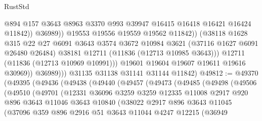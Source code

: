 \begin{lexlean}{RustStd}
\begin{coremodule}
                              @894
                              @157
                              @3643
                              @8963
                              @3370
                              @993
                              @39947
                              @16415
                              @16418
                              @16421
                              @16424
                              @11842))
                          @36989))
                      @19553
                      @19556
                      @19559
                      @19562
                      @11842))
                  (@38118
                    @1628
                    @315
                    @22
                    @27
                    @6091
                    @3643
                    @3574
                    @3672
                    @10984
                    @3621
                    (@37116 @1627 @6091 @26480 @26484)
                    @38181
                    @12711
                    (@11836 (@12713 @10985 @3643)))
                  @12711
                  (@11836 (@12713 @10969 @10991)))
                @19601
                @19604
                @19607
                @19611
                @19616
                @30969))
            @36989)))
      @31135
      @31138
      @31141
      @31144
      @11842)
@49812 := @49370
    (@49395
      (@49436
        (@49438
          (@49440
            (@49457
              (@49473
                (@49485
                  (@49498
                    (@49506
                      (@49510
                        (@49701
                          (@12331
                            @36096
                            @3259
                            @3259
                            @12335
                            @11008
                            @2917
                            @920
                            @896
                            @3643
                            @11046
                            @3643
                            @10840
                            (@38022
                              @2917
                              @896
                              @3643
                              @11045
                              (@37096
                                @359
                                @896
                                @2916
                                @51
                                @3643
                                @11044
                                @4247
                                @12215
                                (@36949

\end{coremodule}
\end{lexlean}
